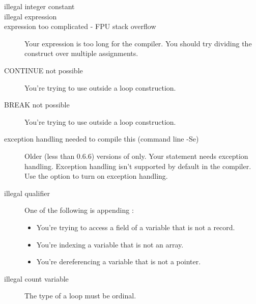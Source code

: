 \documentclass{report}
\newcommand{\seeo}[1]{See \ref{option:#1}}
\begin{document}
\begin{description}
\item [illegal integer constant]

\item [illegal expression]
\item [expression too complicated - FPU stack overflow]
Your expression is too long for the compiler. You should try dividing the
construct over multiple assignments.
\item [CONTINUE not possible]
You're trying to use  outside a loop construction.
\item [BREAK not possible]
You're trying to use  outside a loop construction.
\item [exception handling needed to compile this (command line -Se)]
Older (less than 0.6.6) versions of \fpk only. Your statement needs exception handling. 
Exception handling isn't supported by default in the compiler. 
Use the  option to turn on exception handling.%
\item [illegal qualifier]
One of the following is appending :
\begin{itemize}
\item You're trying to access a field of a variable that is not a record.
\item You're indexing a variable that is not an array.
\item You're dereferencing a variable that is not a pointer. 
\end{itemize}
\item [illegal count variable] The type of a  loop must be ordinal.


\end{description}
\end{document}
